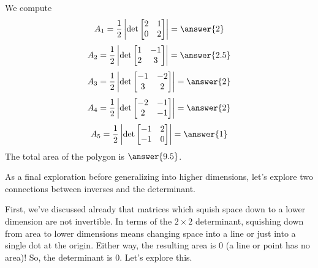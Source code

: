 \documentclass{ximera}
\begin{document}
\begin{example}
\begin{explanation}
\begin{center}
      \end{center}
      We compute
      $$A_1=\frac{1}{2}\left|\det\begin{bmatrix}2 & 1\\0 & 2\end{bmatrix}\right |=\answer{2}$$
      $$A_2=\frac{1}{2}\left|\det\begin{bmatrix}1 & -1\\2 & 3\end{bmatrix}\right |=\answer{2.5}$$
      $$A_3=\frac{1}{2}\left|\det\begin{bmatrix}-1 & -2\\3 & 2\end{bmatrix}\right |=\answer{2}$$
      $$A_4=\frac{1}{2}\left|\det\begin{bmatrix}-2 & -1\\2 & -1\end{bmatrix}\right |=\answer{2}$$
      $$A_5=\frac{1}{2}\left|\det\begin{bmatrix}-1 & 2\\-1 & 0\end{bmatrix}\right |=\answer{1}$$
      The total area of the polygon is $\answer{9.5}$.
      \end{explanation}
      \end{example}

  As a final exploration before generalizing into higher dimensions, let's explore two connections between inverses and the determinant. 

  First, we've discussed already that matrices which squish space down to a lower dimension are not invertible. In terms of the $2\times 2$ determinant, squishing down from area to lower dimensions means changing space into a line or just into a single dot at the origin. Either way, the resulting area is $0$ (a line or point has no area)! So, the determinant is $0$. Let's explore this.
\end{document}
